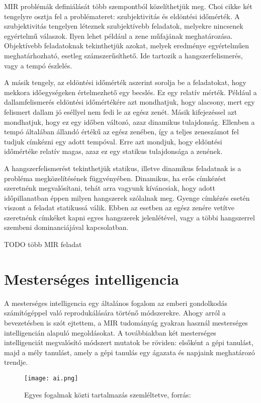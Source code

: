MIR problémák definiálását több szempontból közelíthetjük meg. Choi cikke \cite{Choi2017} két tengelyre osztja fel a problémateret: szubjektivitás és eldöntési időmérték. A szubjektivitás tengelyen léteznek szubjektívebb feladatok, melyekre nincsenek egyértelmű válaszok. Ilyen lehet például a zene műfajának meghatározása. Objektívebb feladatoknak tekinthetjük azokat, melyek eredménye egyértelműen meghatárhozható, esetleg számszerűsíthető. Ide tartozik a hangszerfelismerés, vagy a tempó észlelés. \cite{Choi2017}

A másik tengely, az eldöntési időmérték aszerint sorolja be a feladatokat, hogy mekkora időegységeken értelmezhető egy becslés. Ez egy relatív mérték. Például a dallamfelismerés eldöntési időmértékére azt mondhatjuk, hogy alacsony, mert egy felismert dallam jó eséllyel nem fedi le az egész zenét. Másik kifejezéssel azt mondhatjuk, hogy ez egy időben változó, azaz dinamikus tulajdonság. Ellenben a tempó általában állandó értékű az egész zenében, így a teljes zeneszámot fel tudjuk címkézni egy adott tempóval. Erre azt mondjuk, hogy eldöntési időmértéke relatív magas, azaz ez egy statikus tulajdonsága a zenének.\cite{Choi2017}

A hangszerfelismerést tekinthetjük statikus, illetve dinamikus feladatnak is a probléma megközelítésének függvényében. Dinamikus, ha erős címkézést szeretnénk megvalósítani, tehát arra vagyunk kíváncsiak, hogy adott időpillanatban éppen milyen hangszerek szólalnak meg. Gyenge címkézés esetén viszont a feladat statikussá válik. Ebben az esetben az egész zenére vetítve szeretnénk címkéket kapni egyes hangszerek jelenlétével, vagy a többi hangszerrel szembeni dominanciájával kapcsolatban.

TODO több MIR feladat


\section{Mesterséges intelligencia}

A mesterséges intelligencia egy általános fogalom az emberi gondolkodás számítógéppel való reprodukálására történő módszerekre. Ahogy arról a bevezetésben is szót ejtettem, a MIR tudományág gyakran használ mesterséges intelligencián alapuló megoldásokat. A továbbiakban két mesterséges intelligenciát megvalósító módszert mutatok be röviden: elsőként a gépi tanulást, majd a mély tanulást, amely a gépi tanulás egy ágazata és napjaink meghatározó trendje. \cite{ai}

\begin{figure}[H]
  \texttt{[image: ai.png]}
  \caption{Egyes fogalmak közti tartalmazás szemléltetve, forrás: \cite{ai} }
\end{figure}

